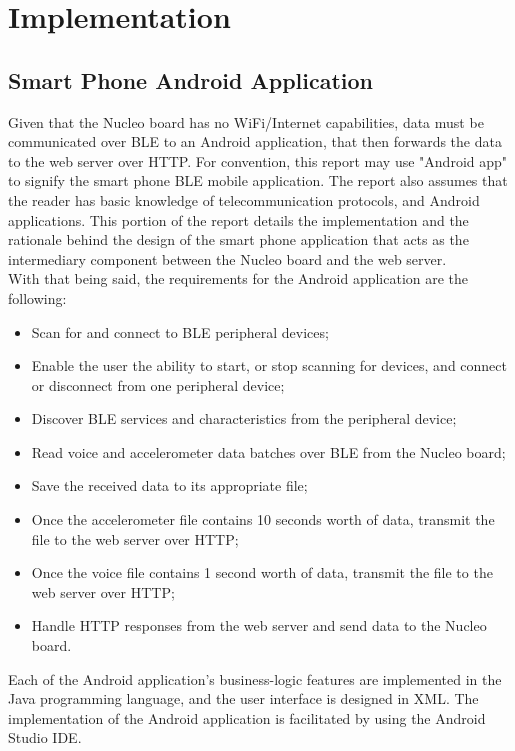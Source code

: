 \section{Implementation}

\subsection{Smart Phone Android Application}

Given that the Nucleo board has no WiFi/Internet capabilities, data must be communicated over BLE to an Android application, that then forwards the data to the web server over HTTP. For convention, this report may use "Android app" to signify the smart phone BLE mobile application. The report also assumes that the reader has basic knowledge of telecommunication protocols, and Android applications. This portion of the report details the implementation and the rationale behind the design of the smart phone application that acts as the intermediary component between the Nucleo board and the web server.\\
With that being said, the requirements for the Android application are the following:

\begin{itemize}
    \item Scan for and connect to BLE peripheral devices;
    \item Enable the user the ability to start, or stop scanning for devices, and connect or disconnect from one peripheral device;
    \item Discover BLE services and characteristics from the peripheral device;
    \item Read voice and accelerometer data batches over BLE from the Nucleo board;
    \item Save the received data to its appropriate file;
    \item Once the accelerometer file contains 10 seconds worth of data, transmit the file to the web server over HTTP;
    \item Once the voice file contains 1 second worth of data, transmit the file to the web server over HTTP;
    \item Handle HTTP responses from the web server and send data to the Nucleo board.
\end{itemize}

Each of the Android application's business-logic features are implemented in the Java programming language, and the user interface is designed in XML. The implementation of the Android application is facilitated by using the Android Studio IDE.\\